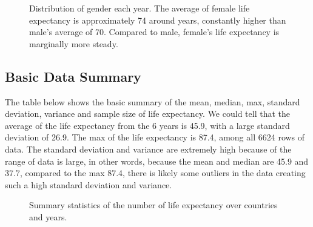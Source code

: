 \documentclass[
  letterpaper,
  DIV=11,
  numbers=noendperiod]{scrartcl}
\begin{document}
\begin{figure}


\caption{\label{fig-gender}Distribution of gender each year. The average
of female life expectancy is approximately 74 around years, constantly
higher than male's average of 70. Compared to male, female's life
expectancy is marginally more steady.}

\end{figure}%

\subsection{Basic Data Summary}\label{basic-data-summary}

The table below shows the basic summary of the mean, median, max,
standard deviation, variance and sample size of life expectancy. We
could tell that the average of the life expectancy from the 6 years is
45.9, with a large standard deviation of 26.9. The max of the life
expectancy is 87.4, among all 6624 rows of data. The standard deviation
and variance are extremely high because of the range of data is large,
in other words, because the mean and median are 45.9 and 37.7, compared
to the max 87.4, there is likely some outliers in the data creating such
a high standard deviation and variance.

\begin{figure}


\caption{\label{fig-summary}Summary statistics of the number of life
expectancy over countries and years.}

\end{figure}%
\end{document}
